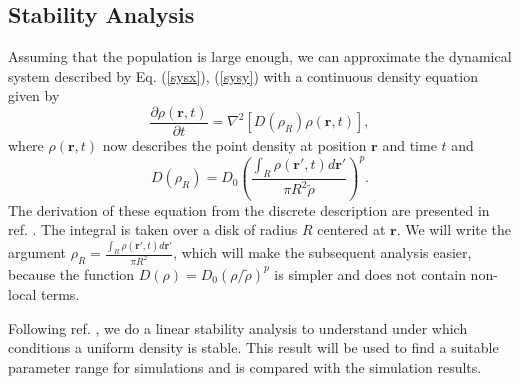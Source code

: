 \documentclass{article}
\renewcommand{\vec}[1]{\boldsymbol{#1}}
\begin{document}
\subsection{Stability Analysis}
Assuming that the population is large enough, we can approximate the dynamical system described by Eq. (\ref{sysx}), (\ref{sysy}) with a continuous density equation given by
\begin{equation} \label{pde}
    \frac{\partial\rho(\vec{r},t)}{\partial t} = \nabla^2[D(\rho_R)\rho(\vec{r},t)],
\end{equation}
where $\rho(\vec{r},t)$ now describes the point density at position $\vec{r}$ and time $t$ and
\begin{equation}
    D(\rho_R) = D_0 \left(\frac{\int_{R} \rho(\vec{r}',t)d\vec{r}'}{\pi R^2 \tilde{\rho}}\right)^p.
\end{equation}
The derivation of these equation from the discrete description are presented in ref. \autocite{lopezMacroscopicDescriptionParticle2006}.
The integral is taken over a disk of radius $R$ centered at $\vec{r}$. 
We will write the argument $\rho_R = \frac{\int_{R} \rho(\vec{r}',t)d\vec{r}'}{\pi R^2}$, which will make the subsequent analysis easier, because the function $D(\rho)=D_0 (\rho/\tilde{\rho})^p$ is simpler and does not contain non-local terms.

Following ref. \cite{lopezMacroscopicDescriptionParticle2006}, we do a linear stability analysis to understand under which conditions a uniform density is stable. 
This result will be used to find a suitable parameter range for simulations and is compared with the simulation results.
\end{document}
